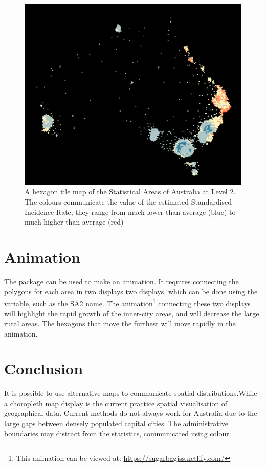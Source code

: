 \documentclass[
]{jss}
\begin{document}
\begin{figure}

{\centering \includegraphics[width=0.6\linewidth]{figures/aus_melanoma_p_hex} 

}

\caption[A hexagon tile map of the Statistical Areas of Australia at Level 2]{A hexagon tile map of the Statistical Areas of Australia at Level 2. The colours communicate the value of the estimated Standardised Incidence Rate, they range from much lower than average (blue) to much higher than average (red)}\label{fig:melanoma-hex}
\end{figure}

\hypertarget{animation}{%
\section{Animation}\label{animation}}

The  package can be used to make an animation. It
requires connecting the polygons for each area in two displays two
displays, which can be done using the  variable, such as the
SA2 name. The animation\footnote{This animation can be viewed at:
  \url{https://sugarbagjss.netlify.com/}} connecting these two displays
will highlight the rapid growth of the inner-city areas, and will
decrease the large rural areas. The hexagons that move the furthest will
move rapidly in the animation.

\hypertarget{conclusion}{%
\section{Conclusion}\label{conclusion}}

It is possible to use alternative maps to communicate spatial
distributions.While a choropleth map display is the current practice
spatial visualisation of geographical data. Current methods do not
always work for Australia due to the large gaps between densely
populated capital cities. The administrative boundaries may distract
from the statistics, communicated using colour.
\end{document}
